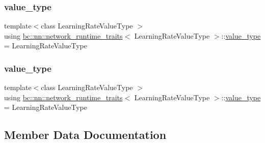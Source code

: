 \subsubsection{\texorpdfstring{value\+\_\+type}{value\_type}\hspace{0.1cm}{\footnotesize\ttfamily [1/2]}}
{\footnotesize\ttfamily template$<$class Learning\+Rate\+Value\+Type $>$ \\
using \hyperlink{structbc_1_1nn_1_1network__runtime__traits}{bc\+::nn\+::network\+\_\+runtime\+\_\+traits}$<$ Learning\+Rate\+Value\+Type $>$\+::\hyperlink{structbc_1_1nn_1_1network__runtime__traits_a1321d62a8c691fc6e6d14c8f100d457b}{value\+\_\+type} =  Learning\+Rate\+Value\+Type}

\mbox{\label{structbc_1_1nn_1_1network__runtime__traits_a1321d62a8c691fc6e6d14c8f100d457b}} 
\subsubsection{\texorpdfstring{value\+\_\+type}{value\_type}\hspace{0.1cm}{\footnotesize\ttfamily [2/2]}}
{\footnotesize\ttfamily template$<$class Learning\+Rate\+Value\+Type $>$ \\
using \hyperlink{structbc_1_1nn_1_1network__runtime__traits}{bc\+::nn\+::network\+\_\+runtime\+\_\+traits}$<$ Learning\+Rate\+Value\+Type $>$\+::\hyperlink{structbc_1_1nn_1_1network__runtime__traits_a1321d62a8c691fc6e6d14c8f100d457b}{value\+\_\+type} =  Learning\+Rate\+Value\+Type}



\subsection{Member Data Documentation}
\mbox{\label{structbc_1_1nn_1_1network__runtime__traits_a4ae9c3b085d55afab9695e73a7b62565}} 
